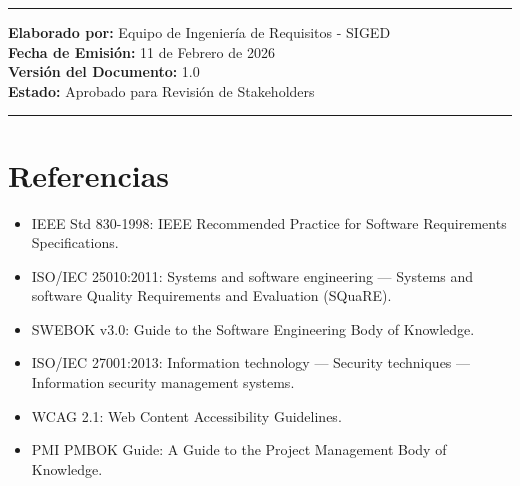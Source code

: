 \documentclass[12pt,a4paper]{article}
\begin{document}
\vspace{1.5cm}

\noindent\rule{\textwidth}{0.5pt}

\vspace{0.5cm}

\begin{center}
\textbf{Elaborado por:} Equipo de Ingeniería de Requisitos - SIGED\\
\textbf{Fecha de Emisión:} 11 de Febrero de 2026\\
\textbf{Versión del Documento:} 1.0\\
\textbf{Estado:} Aprobado para Revisión de Stakeholders
\end{center}

\vspace{0.5cm}

\noindent\rule{\textwidth}{0.5pt}
\newpage
\section{Referencias}

\begin{itemize}[noitemsep]
    \item IEEE Std 830-1998: IEEE Recommended Practice for Software Requirements Specifications.
    \item ISO/IEC 25010:2011: Systems and software engineering — Systems and software Quality Requirements and Evaluation (SQuaRE).
    \item SWEBOK v3.0: Guide to the Software Engineering Body of Knowledge.
    \item ISO/IEC 27001:2013: Information technology — Security techniques — Information security management systems.
    \item WCAG 2.1: Web Content Accessibility Guidelines.
    \item PMI PMBOK Guide: A Guide to the Project Management Body of Knowledge.
\end{itemize}
\end{document}

